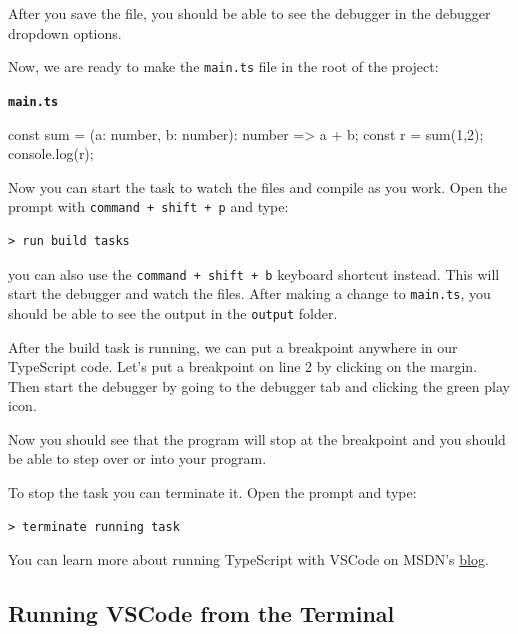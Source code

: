 \documentclass[12pt,]{article}
\newenvironment{Shaded}{}{}
\newcommand{\DataTypeTok}[1]{{#1}}
\newcommand{\DecValTok}[1]{{#1}}
\newcommand{\FunctionTok}[1]{{#1}}
\newcommand{\NormalTok}[1]{{#1}}
\begin{document}
After you save the file, you should be able to see the debugger in the
debugger dropdown options.

Now, we are ready to make the \texttt{main.ts} file in the root of the
project:

\textbf{\texttt{main.ts}}

\begin{Shaded}
\begin{Highlighting}[numbers=left,,]
\DataTypeTok{const} \NormalTok{sum = (a: number, b: number): number => a + b;}
\DataTypeTok{const} \NormalTok{r = }\FunctionTok{sum}\NormalTok{(}\DecValTok{1}\NormalTok{,}\DecValTok{2}\NormalTok{);}
\NormalTok{console.}\FunctionTok{log}\NormalTok{(r);}
\end{Highlighting}
\end{Shaded}

Now you can start the task to watch the files and compile as you work.
Open the prompt with \texttt{command\ +\ shift\ +\ p} and type:

\begin{verbatim}
> run build tasks
\end{verbatim}

you can also use the \texttt{command\ +\ shift\ +\ b} keyboard shortcut
instead. This will start the debugger and watch the files. After making
a change to \texttt{main.ts}, you should be able to see the output in
the \texttt{output} folder.

After the build task is running, we can put a breakpoint anywhere in our
TypeScript code. Let's put a breakpoint on line 2 by clicking on the
margin. Then start the debugger by going to the debugger tab and
clicking the green play icon.

Now you should see that the program will stop at the breakpoint and you
should be able to step over or into your program.

To stop the task you can terminate it. Open the prompt and type:

\begin{verbatim}
> terminate running task
\end{verbatim}

You can learn more about running TypeScript with VSCode on MSDN's
\href{http://blogs.msdn.com/b/typescript/archive/2015/04/30/using-typescript-in-visual-studio-code.aspx}{blog}.

\subsection{Running VSCode from the
Terminal}\label{running-vscode-from-the-terminal}
\end{document}
